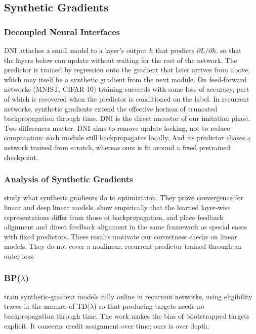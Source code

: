 \documentclass{article}
\begin{document}
\subsection{Synthetic Gradients}

\subsubsection{Decoupled Neural Interfaces}

DNI \parencite{jaderberg2017dni} attaches a small model to a layer's output $h$
that predicts $\partial L/\partial h$, so that the layers below can update
without waiting for the rest of the network. The predictor is trained by
regression onto the gradient that later arrives from above, which may itself be
a synthetic gradient from the next module. On feed-forward networks (MNIST,
CIFAR-10) training succeeds with some loss of accuracy, part of which is
recovered when the predictor is conditioned on the label. In recurrent
networks, synthetic gradients extend the effective horizon of truncated
backpropagation through time. DNI is the direct ancestor of our imitation
phase. Two differences matter. DNI aims to remove update locking, not to reduce
computation: each module still backpropagates locally. And its predictor chases
a network trained from scratch, whereas ours is fit around a fixed pretrained
checkpoint.

\subsubsection{Analysis of Synthetic Gradients}

\textcite{czarnecki2017understanding} study what synthetic gradients do to
optimization. They prove convergence for linear and deep linear models, show
empirically that the learned layer-wise representations differ from those of
backpropagation, and place feedback alignment and direct feedback alignment in
the same framework as special cases with fixed predictors. These results
motivate our correctness checks on linear models. They do not cover a
nonlinear, recurrent predictor trained through an outer loss.

\subsubsection{BP($\lambda$)}

\textcite{pemberton2024bplambda} train synthetic-gradient models fully online
in recurrent networks, using eligibility traces in the manner of TD($\lambda$)
so that producing targets needs no backpropagation through time. The work makes
the bias of bootstrapped targets explicit. It concerns credit assignment over
time; ours is over depth.
\end{document}
